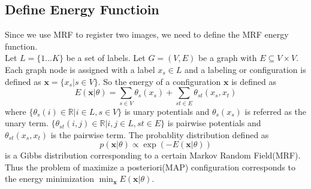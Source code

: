 \documentclass{article} %
\begin{document}
	\subsection{Define Energy Functioin}
	Since we use MRF to register two images, we need to define the MRF energy function. \\
	Let $L = \{1...K\}$ be a set of labels. Let $G = (V, E)$ be a graph with $E \subseteq V\times V$. Each graph node is assigned with a label $x_s \in L$ and a labeling or configuration is defined as $\mathbf{x} = \{x_s|s\in V\}$. So the energy of a configuration $\mathbf{x}$ is defined as
	\begin{equation}
		E(\mathbf{x}|\theta) = \sum_{s\in V}\theta_s(x_s) + \sum_{st\in E}\theta_{st}(x_s, x_t)
	\end{equation}
	where $\displaystyle{\{\theta_s(i)\in\mathbb{R} | i\in L, s\in V\}}$ is unary potentials and $\theta_s(x_s)$ is referred as the unary term. $\displaystyle{\{\theta_{st}(i,j)\in\mathbb{R} | i,j\in L, st\in E\}}$ is pairwise potentials and $\theta_{st}(x_s, x_t)$ is the pairwise term. The probablity distribution defined as
	\begin{equation}
		p(\mathbf{x}|\theta) \propto \exp(-E(\mathbf{x}|\theta))
	\end{equation}
	is a Gibbs distribution corresponding to a certain Markov Random Field(MRF). Thus the problem of maximize a posteriori(MAP) configuration corresponds to the energy minimization $\displaystyle{\min_{\mathbf{x}}E(\mathbf{x}|\theta)}$. \\
\end{document}
